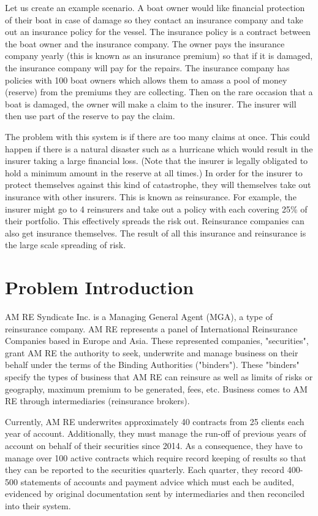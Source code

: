 \documentclass[12pt]{article}
\begin{document}
Let us create an example scenario. A boat owner would like financial protection of their boat in case of damage so they contact an insurance company and take out an insurance policy for the vessel. The insurance policy is a contract between the boat owner and the insurance company. The owner pays the insurance company yearly (this is known as an insurance premium) so that if it is damaged, the insurance company will pay for the repairs. The insurance company has policies with 100 boat owners which allows them to amass a pool of money (reserve) from the premiums they are collecting. Then on the rare occasion that a boat is damaged, the owner will make a claim to the insurer. The insurer will then use part of the reserve to pay the claim.

The problem with this system is if there are too many claims at once. This could happen if there is a natural disaster such as a hurricane which would result in the insurer taking a large financial loss. (Note that the insurer is legally obligated to hold a minimum amount in the reserve at all times.) In order for the insurer to protect themselves against this kind of catastrophe, they will themselves take out insurance with other insurers. This is known as reinsurance. For example, the insurer might go to 4 reinsurers and take out a policy with each covering 25\% of their portfolio. This effectively spreads the risk out. Reinsurance companies can also get insurance themselves. The result of all this insurance and reinsurance is the large scale spreading of risk.


\section{Problem Introduction}
AM RE Syndicate Inc.\cite{amre} is a Managing General Agent (MGA), a type of reinsurance company. AM RE represents a panel of International Reinsurance Companies based in Europe and Asia. These represented companies, "securities", grant AM RE the authority to seek, underwrite and manage business on their behalf under the terms of the Binding Authorities ("binders"). These "binders" specify the types of business that AM RE can reinsure as well as limits of risks or geography, maximum premium to be generated, fees, etc. Business comes to AM RE through intermediaries (reinsurance brokers).

Currently, AM RE underwrites approximately 40 contracts from 25 clients each year of account. Additionally, they must manage the run-off of previous years of account on behalf of their securities since 2014. As a consequence, they have to manage over 100 active contracts which require record keeping of results so that they can be reported to the securities quarterly. Each quarter, they record 400-500 statements of accounts and payment advice which must each be audited, evidenced by original documentation sent by intermediaries and then reconciled into their system.
\end{document}

